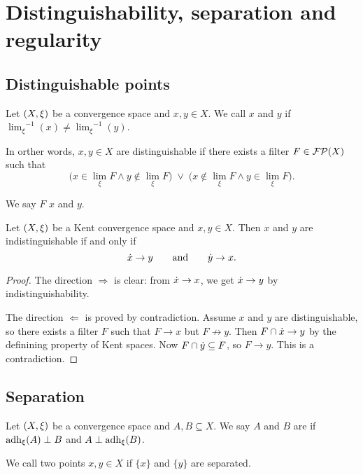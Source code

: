 \section{Distinguishability, separation and regularity}
\subsection{Distinguishable points}
\begin{definition}
Let $\left( X,\xi \right)$ be a convergence space and $x,y\in X$. We call $x$ and $y$  if ${\lim_\xi}^{-1}(x) \neq {\lim_\xi}^{-1}(y)$.
\end{definition}

In orther words, $x,y \in X$ are distinguishable if there exists a filter $F \in \operatorname{\mathcal{FP}}(X)$ such that
\[ \Big(x\in \lim_\xi F \land y\notin \lim_\xi F\Big)\;\lor\; \Big(x\notin \lim_\xi F \land y\in \lim_\xi F\Big). \]

We say $F$  $x$ and $y$.

\begin{proposition} \label{distinguishabilityPrincipalUltrafilters}
Let $\left( X,\xi \right)$ be a Kent convergence space and $x,y\in X$. Then $x$ and $y$ are indistinguishable \textup{if and only if}
\[ \dot{x} \to y \qquad \text{and}\qquad \dot{y}\to x. \]
\end{proposition}
\begin{proof}
The direction $\Rightarrow$ is clear: from $\dot{x} \to x$, we get $\dot{x}\to y$ by indistinguishability.

The direction $\Leftarrow$ is proved by contradiction. Assume $x$ and $y$ are distinguishable, so there exists a filter $F$ such that $F\to x$ but $F\not\to y$. Then $F\cap \dot{x} \to y$ by the definining property of Kent spaces. Now $F\cap \dot{y} \subseteq F$, so $F\to y$. This is a contradiction.
\end{proof}


\subsection{Separation}
\begin{definition}
Let $\left( X,\xi \right)$ be a convergence space and $A,B\subseteq X$. We say $A$ and $B$ are  if $\operatorname{adh}_\xi(A) \perp B$ and $A\perp \operatorname{adh}_\xi(B)$.

We call two points $x,y\in X$  if $\{x\}$ and $\{y\}$ are separated.
\end{definition}

